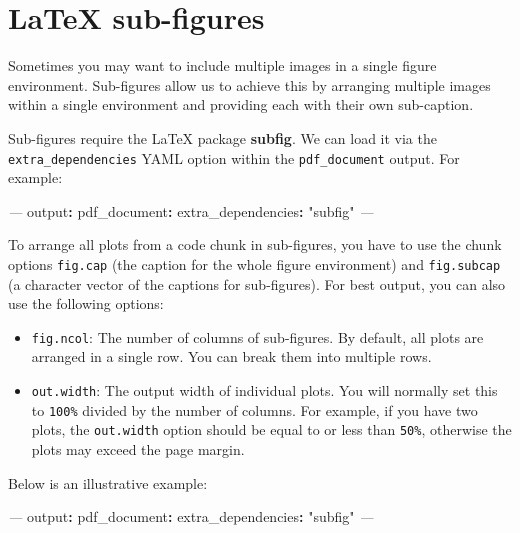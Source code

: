 \documentclass[
  11pt,
]{krantz}
\newenvironment{Shaded}{\begin{snugshade}}{\end{snugshade}}
\newcommand{\AttributeTok}[1]{\textcolor[rgb]{0.61,0.61,0.61}{#1}}
\newcommand{\FunctionTok}[1]{\textcolor[rgb]{0,0,0}{#1}}
\newcommand{\KeywordTok}[1]{\textcolor[rgb]{0.27,0.27,0.27}{\textbf{#1}}}
\newcommand{\PreprocessorTok}[1]{\textcolor[rgb]{0.37,0.37,0.37}{\textit{#1}}}
\newcommand{\StringTok}[1]{\textcolor[rgb]{0.5,0.5,0.5}{#1}}
\begin{document}
\hypertarget{latex-subfigure}{%
\section{LaTeX sub-figures}\label{latex-subfigure}}

Sometimes you may want to include multiple images in a single figure environment. Sub-figures allow us to achieve this by arranging multiple images within a single environment and providing each with their own sub-caption.

Sub-figures require the LaTeX package \textbf{subfig}. We can load it via the \texttt{extra\_dependencies} YAML option within the \texttt{pdf\_document} output. For example:

\begin{Shaded}
\begin{Highlighting}[]
\PreprocessorTok{---}
\FunctionTok{output}\KeywordTok{:}
\AttributeTok{  }\FunctionTok{pdf_document}\KeywordTok{:}
\AttributeTok{    }\FunctionTok{extra_dependencies}\KeywordTok{:}\AttributeTok{ }\StringTok{"subfig"}
\PreprocessorTok{---}
\end{Highlighting}
\end{Shaded}

To arrange all plots from a code chunk in sub-figures, you have to use the chunk options \texttt{fig.cap} (the caption for the whole figure environment) and \texttt{fig.subcap} (a character vector of the captions for sub-figures). For best output, you can also use the following options:

\begin{itemize}
\item
  \texttt{fig.ncol}: The number of columns of sub-figures. By default, all plots are arranged in a single row. You can break them into multiple rows.
\item
  \texttt{out.width}: The output width of individual plots. You will normally set this to \texttt{100\%} divided by the number of columns. For example, if you have two plots, the \texttt{out.width} option should be equal to or less than \texttt{50\%}, otherwise the plots may exceed the page margin.
\end{itemize}

Below is an illustrative example:

\begin{Shaded}
\begin{Highlighting}[]
\PreprocessorTok{---}
\FunctionTok{output}\KeywordTok{:}
\AttributeTok{  }\FunctionTok{pdf_document}\KeywordTok{:}
\AttributeTok{    }\FunctionTok{extra_dependencies}\KeywordTok{:}\AttributeTok{ }\StringTok{"subfig"}
\PreprocessorTok{---}
\end{Highlighting}
\end{Shaded}
\end{document}
